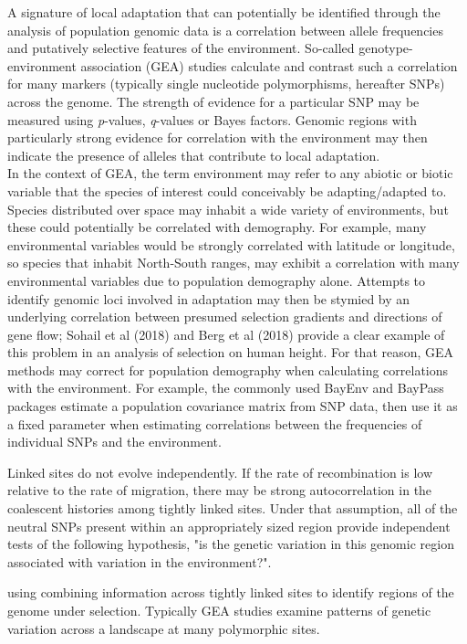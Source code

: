 \documentclass[11pt,twoside,lineno]{GSA_format}
\begin{document}
A signature of local adaptation that can potentially be identified through the analysis of population genomic data is a correlation between allele frequencies and putatively selective features of the environment. So-called genotype-environment association (GEA) studies calculate and contrast such a correlation for many markers (typically single nucleotide polymorphisms, hereafter SNPs) across the genome. The strength of evidence for a particular SNP may be measured using \emph{p}-values, \emph{q}-values or Bayes factors. Genomic regions with particularly strong evidence for correlation with the environment may then indicate the presence of alleles that contribute to local adaptation. \\

In the context of GEA, the term environment may refer to any abiotic or biotic variable that the species of interest could conceivably be adapting/adapted to. Species distributed over space may inhabit a wide variety of environments, but these could potentially be correlated with demography. For example, many environmental variables would be strongly correlated with latitude or longitude, so species that inhabit North-South ranges, may exhibit a correlation with many environmental variables due to population demography alone. Attempts to identify genomic loci involved in adaptation may then be stymied by an underlying correlation between presumed selection gradients and directions of gene flow; Sohail et al (2018) and Berg et al (2018) provide a clear example of this problem in an analysis of selection on human height. For that reason, GEA methods may correct for population demography when calculating correlations with the environment. For example, the commonly used BayEnv and BayPass packages estimate a population covariance matrix from SNP data, then use it as a fixed parameter when estimating correlations between the frequencies of individual SNPs and the environment. 

Linked sites do not evolve independently. If the rate of recombination is low relative to the rate of migration, there may be strong autocorrelation in the coalescent histories among tightly linked sites. Under that assumption, all of the neutral SNPs present within an appropriately sized region provide independent tests of the following hypothesis, "is the genetic variation in this genomic region associated with variation in the environment?".




using combining information across tightly linked sites to identify regions of the genome under selection. 
Typically GEA studies examine patterns of genetic variation across a landscape at many polymorphic sites.  
\end{document}
